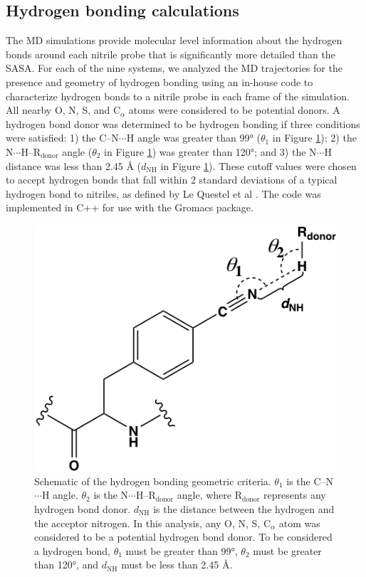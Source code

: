 \subsection{Hydrogen bonding calculations}

The MD simulations provide molecular level information about the hydrogen bonds around each nitrile probe that is significantly more detailed than the SASA.
For each of the nine systems, we analyzed the MD trajectories for the presence and geometry of hydrogen bonding using an in-house code to characterize hydrogen bonds to a nitrile probe in each frame of the simulation.
All nearby O, N, S, and C$_{\alpha}$ atoms were considered to be potential donors.
A hydrogen bond donor was determined to be hydrogen bonding if three conditions were satisfied: 1) the C--N$\cdots$H angle was greater than \ang{99} ($\theta_1$ in Figure \ref{fig:hbond-scheme}); 2) the N$\cdots$H--R$_{\text{donor}}$ angle ($\theta_2$ in Figure \ref{fig:hbond-scheme}) was greater than \ang{120}; and 3) the N$\cdots$H distance was less than 2.45 \si{\angstrom} ($d_{\text{NH}}$ in Figure \ref{fig:hbond-scheme}).
These cutoff values were chosen to accept hydrogen bonds that fall within 2 standard deviations of a typical hydrogen bond to nitriles, as defined by Le Questel et al \cite{LeQuestel2000}.
The code was implemented in C++ for use with the Gromacs package.  

\begin{figure}
    \center
    \includegraphics[width=\single]{figures-gfp-hbond/hbonding_scheme.png}
    \caption[Schematic of the hydrogen bonding geometric criteria]{
        Schematic of the hydrogen bonding geometric criteria. 
        $\theta_1$ is the C--N$\cdots$H angle. 
        $\theta_2$ is the N$\cdots$H--R$_{\text{donor}}$ angle, where R$_{\text{donor}}$ represents any hydrogen bond donor. 
        $d_{\text{NH}}$ is the distance between the hydrogen and the acceptor nitrogen. 
        In this analysis, any O, N, S, C$_{\alpha}$ atom was considered to be a potential hydrogen bond donor. 
        To be considered a hydrogen bond, $\theta_1$ must be greater than \ang{99}, $\theta_2$ must be greater than \ang{120}, and $d_{\text{NH}}$ must be less than 2.45 \si{\angstrom}.
    }
    \label{fig:hbond-scheme}
\end{figure}

